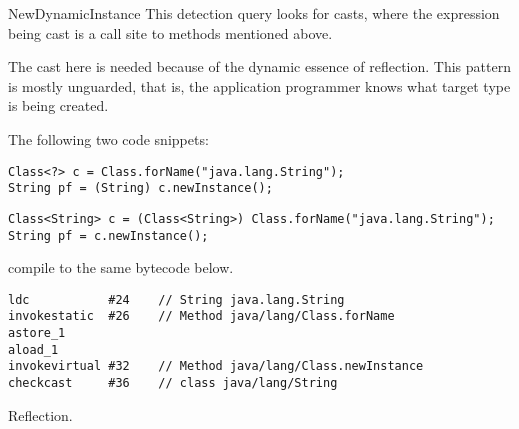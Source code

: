 \begin{pattern}{NewDynamicInstance}
\detection{}
This detection query looks for casts,
where the expression being cast is a call site to methods mentioned above.

\discussion{}
The cast here is needed because of the dynamic essence of reflection.
This pattern is mostly unguarded, that is,
the application programmer knows what target type is being created.

The following two code snippets:

\begin{verbatim}
Class<?> c = Class.forName("java.lang.String");
String pf = (String) c.newInstance();
\end{verbatim}

\begin{verbatim}
Class<String> c = (Class<String>) Class.forName("java.lang.String");
String pf = c.newInstance();
\end{verbatim}

compile to the same bytecode below.

\begin{lstlisting}[style=bytecode]
ldc           #24    // String java.lang.String
invokestatic  #26    // Method java/lang/Class.forName
astore_1
aload_1
invokevirtual #32    // Method java/lang/Class.newInstance
checkcast     #36    // class java/lang/String
\end{lstlisting}

\related{}
Reflection.

\end{pattern}